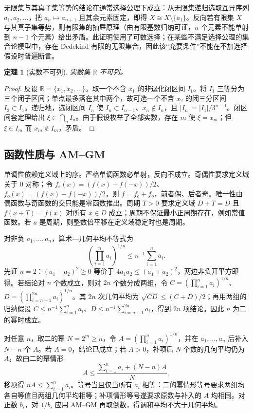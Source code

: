 \documentclass[11pt,a4paper,UTF8]{ctexart}
\newtheorem{theorem}{定理}[section]
\theoremstyle{definition}\newtheorem{definition}[theorem]{定义}
\theoremstyle{remark}\newtheorem{remark}[theorem]{说明}
\begin{document}
无限集与其真子集等势的结论在通常选择公理下成立：从无限集递归选取互异序列 $a_1,a_2,\ldots$，把 $a_n\mapsto a_{n+1}$ 且其余元素固定，即得 $X\cong X\setminus\{a_1\}$。反向若有限集 $X$ 与其真子集等势，则有限集的抽屉原理（由有限基数归纳可证，$n$ 个元素不能单射到 $n-1$ 个元素）给出矛盾。此证明使用了可数选择；在某些不满足选择公理的集合论模型中，存在 Dedekind 有限的无限集合，因此该“充要条件”不能在不加选择假设时普遍断言。

\begin{theorem}[实数不可列]
实数集 $\mathbb R$ 不可列。
\end{theorem}
\begin{proof}
反设 $\mathbb R=\{x_1,x_2,\ldots\}$。取一个不含 $x_1$ 的非退化闭区间 $I_1$。将 $I_1$ 三等分为三个闭子区间；单点最多落在其中两个，故可选一个不含 $x_2$ 的闭三分区间 $I_2\subset I_1$。递归地，选闭区间 $I_n$ 使 $I_n\subset I_{n-1}$、$x_n\notin I_n$，且 $|I_n|=|I_1|/3^{n-1}$。闭区间套定理给出 $\xi\in\bigcap_n I_n$。由于假设枚举了全部实数，存在 $m$ 使 $\xi=x_m$；但 $\xi\in I_m$ 而 $x_m\notin I_m$，矛盾。
\end{proof}

\subsection{函数性质与 AM--GM}
单调性依赖定义域上的序。严格单调函数必单射，反向不成立。奇偶性要求定义域关于 $0$ 对称；令 $f_e(x)=(f(x)+f(-x))/2$、$f_o(x)=(f(x)-f(-x))/2$，则 $f=f_e+f_o$，前者偶、后者奇。唯一性由偶函数与奇函数的交只能是零函数推出。周期 $T>0$ 要求定义域 $D+T=D$ 且 $f(x+T)=f(x)$ 对所有 $x\in D$ 成立；周期不保证最小正周期存在，例如常值函数。若 $a$ 是周期，则整数倍平移在定义域稳定时也是周期。

对非负 $a_1,\ldots,a_n$，算术—几何平均不等式为
\[
(\prod_{i=1}^n a_i)^{1/n}\le n^{-1}\sum_{i=1}^n a_i.
\]
先证 $n=2$：$(a_1-a_2)^2\ge0$ 等价于 $4a_1a_2\le(a_1+a_2)^2$，两边非负开平方即得。若结论对 $n$ 个数成立，则对 $2n$ 个数分成两组，令 $C=(\prod_{i=1}^n a_i)^{1/n}$、$D=(\prod_{i=n+1}^{2n}a_i)^{1/n}$。其 $2n$ 次几何平均为 $\sqrt{CD}\le(C+D)/2$；再用两组的归纳假设 $C\le n^{-1}\sum_{i=1}^n a_i$、$D\le n^{-1}\sum_{i=n+1}^{2n}a_i$，得到 $2n$ 项结论。因此 $n$ 为二的幂时成立。

对任意 $n$，取二的幂 $N=2^m\ge n$，令 $A=(\prod_{i=1}^n a_i)^{1/n}$，并在 $a_1,\ldots,a_n$ 后补入 $N-n$ 个 $A$。若 $A=0$，结论已成立；若 $A>0$，补项后 $N$ 个数的几何平均仍为 $A$，故由二的幂情形
\[
A\le \frac{\sum_{i=1}^n a_i+(N-n)A}{N},
\]
移项得 $nA\le\sum_{i=1}^n a_i$。等号当且仅当所有 $a_i$ 相等：二的幂情形等号要求两组均各自等值且两组几何平均相等；补项情形等号遂要求原数与补入的 $A$ 均相同。对正数 $b_i$，对 $1/b_i$ 应用 AM--GM 再取倒数，得调和平均不大于几何平均。
\end{document}
